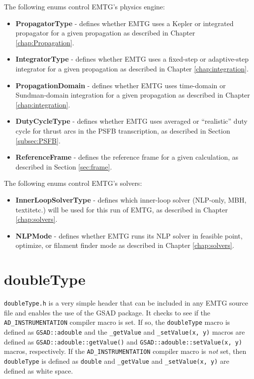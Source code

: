 The following enums control EMTG's physics engine:
\begin{itemize}
	\item \textbf{PropagatorType} - defines whether EMTG uses a Kepler or integrated propagator for a given propagation as described in Chapter \ref{chap:Propagation}.
	\item \textbf{IntegratorType} - defines whether EMTG uses a fixed-step or adaptive-step integrator for a given propagation as described in Chapter \ref{chap:integration}.
	\item \textbf{PropagationDomain} - defines whether EMTG uses time-domain or Sundman-domain integration for a given propagation as described in Chapter \ref{chap:integration}.
	\item \textbf{DutyCycleType} - defines whether EMTG uses averaged or ``realistic'' duty cycle for thrust arcs in the \ac{PSFB} transcription, as described in Section \ref{subsec:PSFB}.
	\item \textbf{ReferenceFrame} - defines the reference frame for a given calculation, as described in Section \ref{sec:frame}.
\end{itemize}

The following enums control EMTG's solvers:
\begin{itemize}
	\item \textbf{InnerLoopSolverType} - defines which inner-loop solver (NLP-only, MBH, textit{etc.}) will be used for this run of EMTG, as described in Chapter \ref{chap:solvers}.
	\item \textbf{NLPMode} - defines whether EMTG runs its NLP solver in feasible point, optimize, or filament finder mode as described in Chapter \ref{chap:solvers}.
\end{itemize}

\section{doubleType}
\label{sec:doubleType}

\texttt{doubleType.h} is a very simple header that can be included in any EMTG source file and enables the use of the \ac{GSAD} package. It checks to see if the \texttt{AD\_INSTRUMENTATION} compiler macro is set. If so, the \texttt{doubleType} macro is defined as \texttt{GSAD::adouble} and the \texttt{\_getValue} and \texttt{\_setValue(x, y)} macros are defined as \texttt{GSAD::adouble::getValue()} and \texttt{GSAD::adouble::setValue(x, y)} macros, respectively. If the \texttt{AD\_INSTRUMENTATION} compiler macro is \textit{not} set, then \texttt{doubleType} is defined as \texttt{double} and \texttt{\_getValue} and \texttt{\_setValue(x, y)} are defined as white space.

